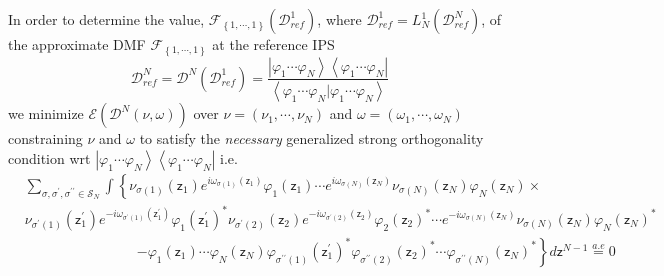 \documentclass[aps,preprint]{revtex4}%
\begin{document}
In order to determine the value, $\mathcal{F}_{\left\{  1,\cdots,1\right\}
}\left(  \mathcal{D}_{ref}^{1}\right)  $, where $\mathcal{D}_{ref}^{1}%
=L_{N}^{1}\left(  \mathcal{D}_{ref}^{N}\right)  $, of the approximate DMF
$\mathcal{F}_{\left\{  1,\cdots,1\right\}  }$ at the reference IPS
\begin{equation}
\mathcal{D}_{ref}^{N}=\mathcal{D}^{N}\left(  \mathcal{D}_{ref}^{1}\right)
=\frac{\left\vert \varphi_{1}\cdots\varphi_{N}\right\rangle \left\langle
\varphi_{1}\cdots\varphi_{N}\right\vert }{\left\langle \varphi_{1}%
\cdots\varphi_{N}|\varphi_{1}\cdots\varphi_{N}\right\rangle }%
\end{equation}
we minimize $\mathcal{E}\left(  \mathcal{D}^{N}\left(  \nu,\omega\right)
\right)  $ over $\nu=\left(  \nu_{1},\cdots,\nu_{N}\right)  $ and
$\omega=\left(  \omega_{1},\cdots,\omega_{N}\right)  \mathsf{\ }$constraining
$\nu$ and $\omega$ to satisfy the \emph{necessary }generalized strong
orthogonality condition wrt $\left\vert \varphi_{1}\cdots\varphi
_{N}\right\rangle \left\langle \varphi_{1}\cdots\varphi_{N}\right\vert $ i.e.%
\begin{align}
&
{\textstyle\sum\limits_{\sigma,\sigma^{\prime},\sigma^{\prime\prime}%
\in\mathcal{S}_{N}}}
{\displaystyle\int}
\left\{  \nu_{\sigma\left(  1\right)  }\left(  \mathsf{z}_{1}\right)
e^{i\omega_{\sigma\left(  1\right)  }\left(  \mathsf{z}_{1}\right)  }%
\varphi_{1}\left(  \mathsf{z}_{1}\right)  \cdots e^{i\omega_{\sigma\left(
N\right)  }\left(  \mathsf{z}_{N}\right)  }\nu_{\sigma\left(  N\right)
}\left(  \mathsf{z}_{N}\right)  \varphi_{N}\left(  \mathsf{z}_{N}\right)
\times\right. \nonumber\\
&  \nu_{\sigma^{\prime}\left(  1\right)  }\left(  \mathsf{z}_{1}^{\prime
}\right)  e^{-i\omega_{\sigma^{\prime}\left(  1\right)  }\left(
\mathsf{z}_{1}^{\prime}\right)  }\varphi_{1}\left(  \mathsf{z}_{1}^{\prime
}\right)  ^{\ast}\nu_{\sigma^{\prime}\left(  2\right)  }\left(  \mathsf{z}%
_{2}\right)  e^{-i\omega_{\sigma^{\prime}\left(  2\right)  }\left(
\mathsf{z}_{2}\right)  }\varphi_{2}\left(  \mathsf{z}_{2}\right)  ^{\ast
}\cdots e^{-i\omega_{\sigma\left(  N\right)  }\left(  \mathsf{z}_{N}\right)
}\nu_{\sigma\left(  N\right)  }\left(  \mathsf{z}_{N}\right)  \varphi
_{N}\left(  \mathsf{z}_{N}\right)  ^{\ast}\nonumber\\
&  \qquad\qquad\qquad\qquad\left.  -\varphi_{1}\left(  \mathsf{z}_{1}\right)
\cdots\varphi_{N}\left(  \mathsf{z}_{N}\right)  \varphi_{\sigma^{\prime\prime
}\left(  1\right)  }\left(  \mathsf{z}_{1}^{\prime}\right)  ^{\ast}%
\varphi_{\sigma^{\prime\prime}\left(  2\right)  }\left(  \mathsf{z}%
_{2}\right)  ^{\ast}\cdots\varphi_{\sigma^{\prime\prime}\left(  N\right)
}\left(  \mathsf{z}_{N}\right)  ^{\ast}\right\}  d\mathsf{z}^{N-1}%
\overset{a.e}{=}0
\end{align}
\end{document}
